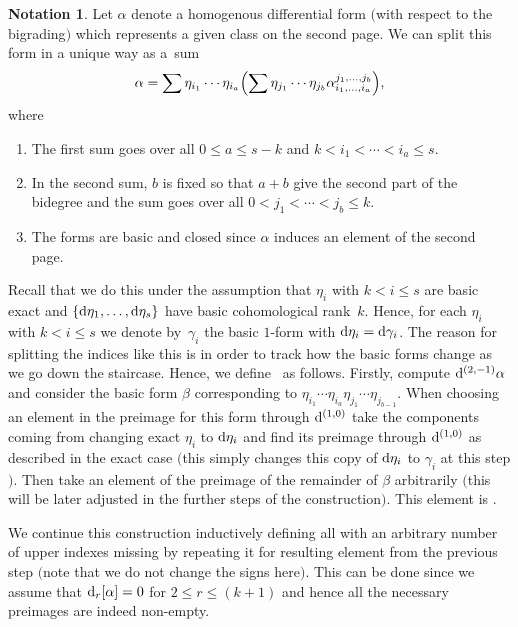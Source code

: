 \documentclass[pdftex]{sigma}
\numberwithin{equation}{section}
\theoremstyle{definition}
\newtheorem{Not}[tw]{Notation}
\begin{document}
\begin{Not} Let $\alpha$ denote a homogenous differential form $($with respect to the bigrading$)$ which represents a given class on the second page. We can split this form in a unique way as a~sum
\[\alpha=\sum \eta_{i_1}\cdots \eta_{i_a}\Bigl(\sum \eta_{j_1}\cdots \eta_{j_b}\alpha_{i_1,\dots,i_a}^{j_1,\dots,j_b}\Bigr),\]
where
\begin{enumerate}\itemsep=0pt
\item[$1.$] The first sum goes over all $0 \leq a\leq s-k$ and $k<i_1<\cdots <i_a\leq s$.
\item[$2.$] In the second sum, $b$ is fixed so that $a+b$ give the second part of the bidegree and the sum goes over all $0<j_1<\cdots <j_b\leq k$.
\item[$3.$] The forms  are basic and closed since $\alpha$ induces an element of the second page.
\end{enumerate}
Recall that we do this under the assumption that $\eta_{i}$ with $k<i\leq s$ are basic exact and $\{{\rm d}\eta_1,\dots,{\rm d}\eta_s\}$ have basic cohomological rank~$k$. Hence, for each $\eta_i$ with $k<i\leq s$ we denote by~$\gamma_i$ the basic $1$-form with ${\rm d}\eta_i={\rm d}\gamma_i$. The reason for splitting the indices like this is in order to track how the basic forms change as we go down the staircase. Hence, we define~ as follows. Firstly, compute ${\rm d}^{(2,-1)}\alpha$ and consider the basic form $\beta$ corresponding to $\eta_{i_1}\cdots \eta_{i_a}\eta_{j_1}\cdots \eta_{j_{b-1}}$. When choosing an element in the preimage for this form through ${\rm d}^{(1,0)}$ take the components coming from changing exact $\eta_i$ to ${\rm d}\eta_i$ and find its preimage through ${\rm d}^{(1,0)}$ as described in the exact case $($this simply changes this copy of ${\rm d}\eta_i$ to $\gamma_i$ at this step$)$. Then take an element of the preimage of the remainder of $\beta$ arbitrarily $($this will be later adjusted in the further steps of the construction$)$. This element is .

 We continue this construction inductively defining all  with an arbitrary number of upper indexes missing by repeating it for resulting element from the previous step $($note that we do not change the signs here$)$. This can be done since we assume that ${\rm d}_r[\alpha]=0$ for $2\leq r\leq (k+1)$ and hence all the necessary preimages are indeed non-empty.
\end{Not}
\end{document}
